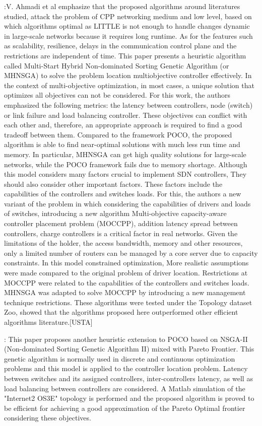 \documentclass[a4paper,10pt]{article}
\begin{document}
\cite{VaMo18}:V. Ahmadi et al emphasize that the proposed algorithms around literatures studied, attack the problem of CPP networking medium and low level, based on which algorithms optimal as LITTLE is not enough to handle changes dynamic in large-scale networks because it requires long runtime. As for the features such as scalability, resilience, delays in the communication control plane and the restrictions are independent of time. This paper presents a heuristic algorithm called Multi-Start Hybrid Non-dominated Sorting Genetic Algorithm (or MHNSGA) to solve the problem location multiobjective controller effectively. In the context of multi-objective optimization, in most cases, a unique solution that optimizes all objectives can not be considered. For this work, the authors emphasized the following metrics: the latency between controllers, node (switch) or link failure and load balancing controller. These objectives can conflict with each other and, therefore, an appropriate approach is required to find a good tradeoff between them. Compared to the framework POCO, the proposed algorithm is able to find near-optimal solutions with much less run time and memory. In particular, MHNSGA can get high quality solutions for large-scale networks, while the POCO framework fails due to memory shortage. Although this model considers many factors crucial to implement SDN controllers, They should also consider other important factors. These factors include the capabilities of the controllers and switches loads. For this, the authors a new variant of the problem in which considering the capabilities of drivers and loads of switches, introducing a new algorithm Multi-objective capacity-aware controller placement problem (MOCCPP), addition latency spread between controllers, charge controllers is a critical factor in real networks. Given the limitations of the holder, the access bandwidth, memory and other resources, only a limited number of routers can be managed by a core server due to capacity constraints. In this model constrained optimization, More realistic assumptions were made compared to the original problem of driver location. Restrictions at MOCCPP were related to the capabilities of the controllers and switches loads. MHNSGA was adapted to solve MOCCPP by introducing a new management technique restrictions. These algorithms were tested under the Topology dataset Zoo, showed that the algorithms proposed here outperformed other efficient algorithms literature.[USTA]

\cite{JaAh15}: This paper proposes another heuristic extension to POCO based on NSGA-II (Non-dominated Sorting Genetic Algorithm II)  mixed with Pareto Frontier. This genetic algorithm is normally used in discrete and continuous optimization problems and this model is applied to the controller location problem. Latency between switches and its assigned controllers, inter-controllers latency, as well as load balancing between controllers are considered. A Matlab simulation of the "Internet2 OS3E" topology is performed and the proposed algorithm is proved to be efficient for achieving a good approximation of the Pareto Optimal frontier considering these objectives. 
\end{document}
